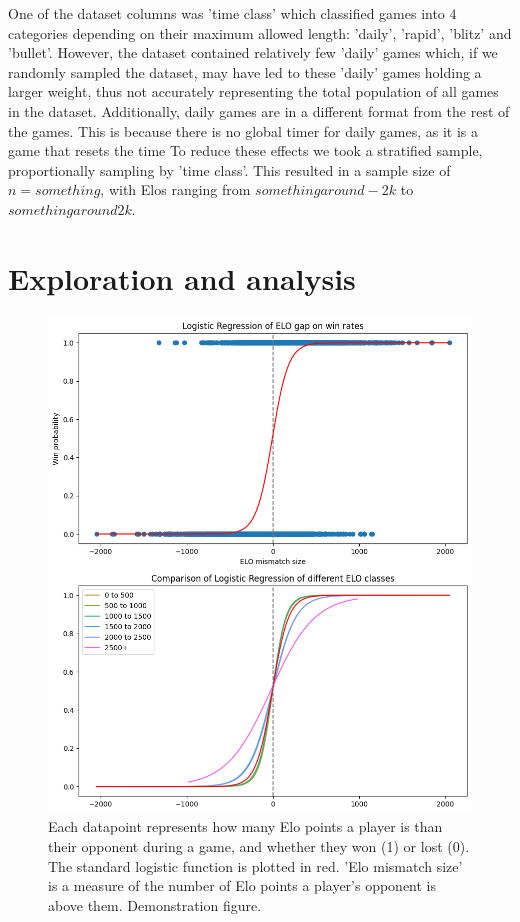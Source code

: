\documentclass[10pt,a4paper,twocolumn]{article}
\begin{document}
One of the dataset columns was 'time class' which classified games into $4$ categories depending on their maximum allowed length: 'daily', 'rapid', 'blitz' and 'bullet'. However, the dataset contained relatively few 'daily' games which, if we randomly sampled the dataset, may have led to these 'daily' games holding a larger weight, thus not accurately representing the total population of all games in the dataset. Additionally, daily games are in a different format from the rest of the games. This is because there is no global timer for daily games, as it is a game that resets the time
To reduce these effects we took a stratified sample, proportionally sampling by 'time class'. This resulted in a sample size of $n={something}$, with Elos ranging from ${something around -2k}$ to ${something around 2k}$. \newline

\section{Exploration and  analysis}

\begin{figure}[t]
  \centering
  \includegraphics{report/images/log_regression_dual.png}
  \caption{Each datapoint represents how many Elo points a player is than their opponent during a game, and whether they won (1) or lost (0). The standard logistic function is plotted in red. 'Elo mismatch size' is a measure of the number of Elo points a player's opponent is above them.
  Demonstration figure.}
  \label{fds-project-template:fig:log_regression}
\end{figure}
\end{document}
